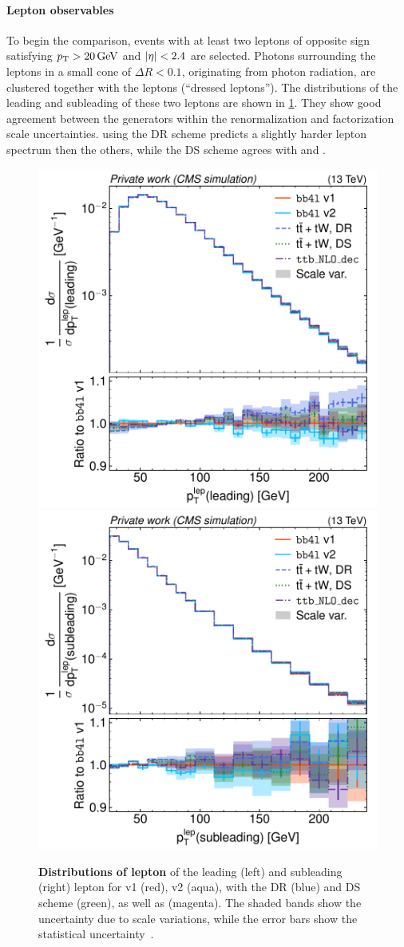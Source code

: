 \paragraph{Lepton observables} To begin the comparison, events with at least two leptons of opposite sign satisfying $\pt > \SI{20}{\GeV}$ and $|\eta| < 2.4$ are selected. Photons surrounding the leptons in a small cone of $\Delta R < 0.1$, originating from photon radiation, are clustered together with the leptons (``dressed leptons''). The \pt distributions of the leading and subleading of these two leptons are shown in \cref{fig:bb4l:leppt}. They show good agreement between the generators within the renormalization and factorization scale uncertainties. \tttWsum using the DR scheme predicts a slightly harder lepton spectrum then the others, while the DS scheme agrees with \bbfourl and \ttb.

\begin{figure}[tp]
    \centering
    \includegraphics[width=0.49 \textwidth]{figures/bb4l/generators/MC_TTBAR_DILEP_SPINDENSITY_lep_pt_1.pdf}
    \hfill
    \includegraphics[width=0.49 \textwidth]{figures/bb4l/generators/MC_TTBAR_DILEP_SPINDENSITY_lep_pt_2.pdf}
    \caption{\textbf{Distributions of lepton \pt} of the leading (left) and subleading
      (right) lepton for
      \bbfourl v1 (red), v2 (aqua), \tttWsum with the DR (blue) and DS scheme
      (green), as well as \ttb (magenta). The shaded bands show the
      uncertainty due to scale variations, while the error bars show
      the statistical uncertainty~\cite{CMS:NOTE-2023-015}.}
    \label{fig:bb4l:leppt}
\end{figure}

